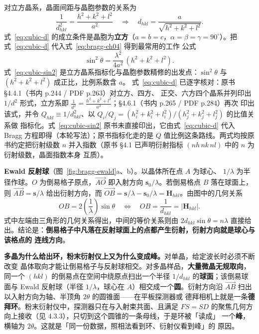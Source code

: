 对立方晶系，晶面间距与晶胞参数的关系为
\begin{equation}
\frac{1}{d_{hkl}^{2}}=\frac{h^{2}+k^{2}+l^{2}}{a^{2}}
\quad\Longrightarrow\quad
d_{hkl}=\frac{a}{\sqrt{h^{2}+k^{2}+l^{2}}}.
\label{eq:cubic-d}
\end{equation}
式~\eqref{eq:cubic-d} 的成立条件是晶胞为\textbf{立方}（$a=b=c$，$\alpha=\beta=
\gamma=90^{\circ}$）。把式~\eqref{eq:cubic-d} 代入式~\eqref{eq:bragg-ch04} 得到最常用的工作
公式
\begin{equation}
\sin^{2}\theta=\frac{\lambda^{2}}{4a^{2}}\,(h^{2}+k^{2}+l^{2}).
\label{eq:cubic-sin2}
\end{equation}
式~\eqref{eq:cubic-sin2} 是立方晶系指标化与晶胞参数精修的出发点：$\sin^{2}\theta$ 与
$(h^{2}+k^{2}+l^{2})$ 成正比，比例系数含 $a$。
式~\eqref{eq:cubic-d} 已逐字核对：原书 §4.4.1（书内 p.244 / PDF p.263）对立方、四方、
正交、六方四个晶系并列印出 $1/d^{2}$ 形式，立方系即
$\frac{1}{d^{2}}=\frac{h^{2}+k^{2}+l^{2}}{a^{2}}$；§4.6.1（书内 p.265 / PDF p.284）再次
印出该式，并令 $Q_{hkl}\equiv1/d_{hkl}^{2}$、以
$Q_{i}/Q_{j}=(h_{i}^{2}+k_{i}^{2}+l_{i}^{2})/(h_{j}^{2}+k_{j}^{2}+l_{j}^{2})$ 的比值关系做
指标化。式~\eqref{eq:cubic-sin2} 原书未直接印出，它由式~\eqref{eq:cubic-d} 代入 Bragg
方程即得（本轮写法）；原书指标化走的是 $Q$ 值比例这条路线。两式均按原书约定把衍射级数
$n$ 并入指数（原书 §4.1 已声明衍射指标 $(nh\,nk\,nl)$ 中的 $n$ 为衍射级数，晶面指数本身
互质）。

\textbf{Ewald 反射球}（图~\ref{fig:bragg-ewald}a、b）。以晶体所在点 $A$ 为球心、
$1/\lambda$ 为半径作球。$O$ 为倒易格子原点，$\overrightarrow{AO}$ 即入射方向
$\boldsymbol{s}_0/\lambda$。若倒易格点 $B$ 落在球面上，则
$\overrightarrow{AB}=\boldsymbol{s}/\lambda$ 给出衍射方向，而
$\overrightarrow{OB}=\boldsymbol{s}/\lambda-\boldsymbol{s}_0/\lambda
=\boldsymbol{H}_{hkl}$。由图中的几何关系
\begin{equation}
OB=2\!\left(\frac{1}{\lambda}\right)\sin\theta
\quad\Longleftrightarrow\quad
OB=\frac{1}{d_{hkl}}=\left|\boldsymbol{H}_{hkl}\right| .
\label{eq:ewald-geom}
\end{equation}
式中左端由三角形的几何关系得出，中间的等价关系则由
$2d_{hkl}\sin\theta=n\lambda$ 直接给出。结论是：\textbf{倒易格子中凡落在反射球面上的点都产生衍射，衍射方向就是球心与该格点的
连线方向}。

\textbf{多晶为什么给出环，粉末衍射仪上又为什么变成峰。}对单晶，给定波长时必须不断改变
晶体取向才能让倒易格子与反射球相交。对多晶样品，\textbf{大量微晶无规取向}，同一个
$(hkl)$ 的倒易点在空间中绕原点扫出一个半径 $1/d_{hkl}$ 的\textbf{球面}；该倒易球面与
Ewald 反射球（半径 $1/\lambda$，球心在 $A$）相交成一个\textbf{圆}。衍射方向沿
$\overrightarrow{AB}$ 扫出以入射方向为轴、半顶角 $2\theta$ 的圆锥面——在平板探测器或
德拜相机上就是一条\textbf{德拜环}。粉末衍射仪中，探测器只在与入射束共面、且满足
$FS=SD$ 的聚焦几何方向上接收（见 4.3.3），只切到这个圆锥的一条母线，于是环被「读成」
一个\textbf{峰}，横轴为 $2\theta$。这就是「同一份数据，照相法看到环、衍射仪看到峰」的
原因。

